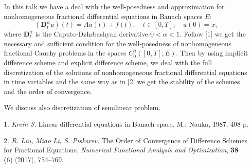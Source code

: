 
\vzmscaption

In this talk we have a deal with the well-posedness and approximation for nonhomogeneous
 fractional differential equations in Banach spaces $E$:
 $$ (\mathbf{D}_{t}^{\alpha} u)(t) = A u(t) + f (t), \quad t \in [0,T];\quad
u(0)=x, $$
where $\mathbf{D}_{t}^{\alpha}$ is the Caputo-Dzhrbashyan derivative $0 < \alpha < 1.$
Follow [1] we get the necessary and sufficient condition for the well-posedness of
nonhomogeneous fractional Cauchy problems in the spaces $C_0^\beta([0,T];E)$.
Then by using implicit difference scheme and explicit difference scheme, we
deal with the full discretization of the solutions of nonhomogeneous
fractional differential equations in time variables and the same way as in [2] we
get the stability of the schemes and the order of convergence.

We discuss also discretization of semilinear problem.


\litlist

1. {\it Krein S.} Linear differential equations in Banach space. M.: Nauka, 1987. 408 p.

2. {\it R. Liu, Miao Li, S. Piskarev.} The Order of Convergence of Difference Schemes for
Fractional Equations. {\em Numerical Functional Analysis and Optimization}, {\bf 38} (6)
(2017), 754--769.
